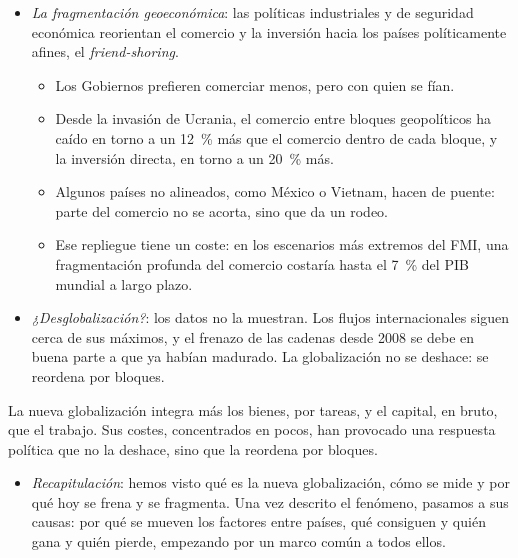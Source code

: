 \documentclass[11pt]{article}
\begin{document}
\begin{itemize}
\begin{itemize}
  \end{itemize}
\item \emph{La fragmentación geoeconómica}: las políticas industriales y de seguridad económica reorientan el comercio y la inversión hacia los países políticamente afines, el \emph{friend-shoring}.
  \begin{itemize}
  \item Los Gobiernos prefieren comerciar menos, pero con quien se fían.
  \item Desde la invasión de Ucrania, el comercio entre bloques geopolíticos ha caído en torno a un 12~\% más que el comercio dentro de cada bloque, y la inversión directa, en torno a un 20~\% más\nocite{Gopinath2025Linkages}.
  \item Algunos países no alineados, como México o Vietnam, hacen de puente: parte del comercio no se acorta, sino que da un rodeo\nocite{Gopinath2025Linkages}.
  \item Ese repliegue tiene un coste: en los escenarios más extremos del FMI, una fragmentación profunda del comercio costaría hasta el 7~\% del PIB mundial a largo plazo\nocite{Aiyar2023Fragmentacion}.
  \end{itemize}
\item \emph{¿Desglobalización?}: los datos no la muestran. Los flujos internacionales siguen cerca de sus máximos\nocite{DHL2026GCR}, y el frenazo de las cadenas desde 2008 se debe en buena parte a que ya habían madurado\nocite{Antras2020Deglobalisation}. La globalización no se deshace: se reordena por bloques.
\end{itemize}

\begin{ideaclave}
La nueva globalización integra más los bienes, por tareas, y el capital, en bruto, que el trabajo. Sus costes, concentrados en pocos, han provocado una respuesta política que no la deshace, sino que la reordena por bloques.
\end{ideaclave}

\begin{itemize}
\item \emph{Recapitulación}: hemos visto qué es la nueva globalización, cómo se mide y por qué hoy se frena y se fragmenta. Una vez descrito el fenómeno, pasamos a sus causas: por qué se mueven los factores entre países, qué consiguen y quién gana y quién pierde, empezando por un marco común a todos ellos.
\end{itemize}

\end{document}
